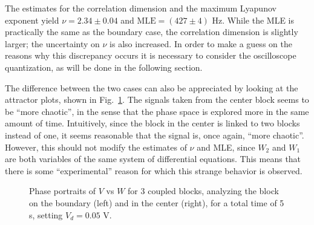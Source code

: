 The estimates for the correlation dimension and the maximum Lyapunov exponent yield
$\nu=2.34\pm0.04$ and $\text{MLE}=(427\pm4)$ Hz.
While the MLE is practically the same as the boundary case, the correlation dimension is slightly
larger; the uncertainty on $\nu$ is also increased.
In order to make a guess on the reasons why
this discrepancy occurs it is necessary to consider the oscilloscope quantization,
as will be done in the following section.

The difference between the two cases can also be appreciated by looking at the attractor plots,
shown in Fig.~\ref{fig: 3 blocks attractors}. The signals taken from the center block seems to be
``more chaotic'', in the sense that the phase space is explored more in the same amount of time.
Intuitively, since the block in the center is linked to two blocks instead of one, it seems reasonable
that the signal is, once again, ``more chaotic''.
However, this should not modify the estimates of $\nu$ and MLE, since $W_2$ and $W_1$ are both
variables of the same system of differential equations. This means that there is some
``experimental'' reason for which this strange behavior is observed.

\begin{figure}[ht!]
    \centering
    \caption{Phase portraits of $V$ vs $W$ for 3 coupled blocks, analyzing the block on the boundary
    (left) and in the center (right), for a total time of 5 s, setting $V_d=0.05$ V.
    }\label{fig: 3 blocks attractors}  
\end{figure}


